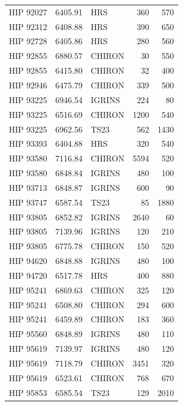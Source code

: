 \begin{scriptsize}
\begin{longtable}{|l|rlrr|}
   HIP 92027 &  6405.91 &        HRS &      360 &   570 \\
   HIP 92312 &  6408.88 &        HRS &      390 &   650 \\
   HIP 92728 &  6405.86 &        HRS &      280 &   560 \\
   HIP 92855 &  6880.57 &     CHIRON &       30 &   550 \\
   HIP 92855 &  6415.80 &     CHIRON &       32 &   400 \\
   HIP 92946 &  6475.79 &     CHIRON &      339 &   500 \\
   HIP 93225 &  6946.54 &     IGRINS &      224 &    80 \\
   HIP 93225 &  6516.69 &     CHIRON &     1200 &   540 \\
   HIP 93225 &  6962.56 &       TS23 &      562 &  1430 \\
   HIP 93393 &  6404.88 &        HRS &      320 &   540 \\
   HIP 93580 &  7116.84 &     CHIRON &     5594 &   520 \\
   HIP 93580 &  6848.84 &     IGRINS &      480 &   100 \\
   HIP 93713 &  6848.87 &     IGRINS &      600 &    90 \\
   HIP 93747 &  6587.54 &       TS23 &       85 &  1880 \\
   HIP 93805 &  6852.82 &     IGRINS &     2640 &    60 \\
   HIP 93805 &  7139.96 &     IGRINS &      120 &   210 \\
   HIP 93805 &  6775.78 &     CHIRON &      150 &   520 \\
   HIP 94620 &  6848.88 &     IGRINS &      480 &   100 \\
   HIP 94720 &  6517.78 &        HRS &      400 &   880 \\
   HIP 95241 &  6869.63 &     CHIRON &      325 &   120 \\
   HIP 95241 &  6508.80 &     CHIRON &      294 &   600 \\
   HIP 95241 &  6459.89 &     CHIRON &      183 &   360 \\
   HIP 95560 &  6848.89 &     IGRINS &      480 &   110 \\
   HIP 95619 &  7139.97 &     IGRINS &      480 &   120 \\
   HIP 95619 &  7118.79 &     CHIRON &     3451 &   320 \\
   HIP 95619 &  6523.61 &     CHIRON &      768 &   670 \\
   HIP 95853 &  6585.54 &       TS23 &      129 &  2010 \\

\end{longtable}
\end{scriptsize}
